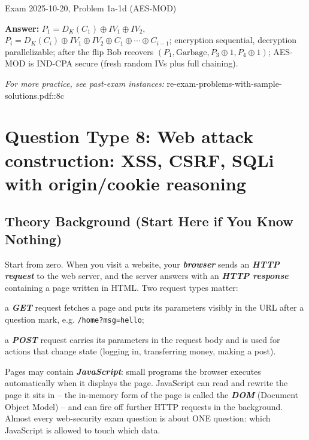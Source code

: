 \documentclass[12pt, a4paper]{article}
\newcommand{\term}[1]{\textbf{\textit{#1}}}        %
\begin{document}
\begin{practicebox}{Exam 2025-10-20, Problem 1a-1d (AES-MOD)}
\begin{itemize}
\end{itemize}
\textbf{Answer:} $P_1 = D_K(C_1) \oplus IV_1 \oplus IV_2$, $P_i = D_K(C_i) \oplus IV_1 \oplus IV_2 \oplus C_1 \oplus \cdots \oplus C_{i-1}$; encryption sequential, decryption parallelizable; after the flip Bob recovers $(P_1, \text{Garbage}, P_3 \oplus 1, P_4 \oplus 1)$; AES-MOD is IND-CPA secure (fresh random IVs plus full chaining).
\end{practicebox}

\textit{For more practice, see past-exam instances:} re-exam-problems-with-sample-solutions.pdf::8c

\section{Question Type 8: Web attack construction: XSS, CSRF, SQLi with origin/cookie reasoning}

\subsection*{Theory Background (Start Here if You Know Nothing)}
Start from zero. When you visit a website, your \term{browser} sends an \term{HTTP request} to the web server, and the server answers with an \term{HTTP response} containing a page written in HTML. Two request types matter:\begin{tightitem}\item a \term{GET} request fetches a page and puts its parameters visibly in the URL after a question mark, e.g. \texttt{/home?msg=hello};\item a \term{POST} request carries its parameters in the request body and is used for actions that change state (logging in, transferring money, making a post).\end{tightitem}Pages may contain \term{JavaScript}: small programs the browser executes automatically when it displays the page. JavaScript can read and rewrite the page it sits in -- the in-memory form of the page is called the \term{DOM} (Document Object Model) -- and can fire off further HTTP requests in the background. Almost every web-security exam question is about ONE question: which JavaScript is allowed to touch which data.
\end{document}
